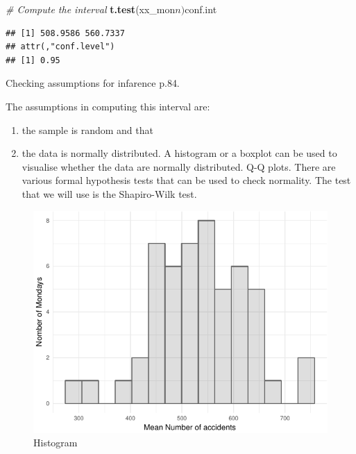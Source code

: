 \documentclass[]{article}
\newenvironment{Shaded}{\begin{snugshade}}{\end{snugshade}}
\newcommand{\KeywordTok}[1]{\textcolor[rgb]{0.13,0.29,0.53}{\textbf{{#1}}}}
\newcommand{\CommentTok}[1]{\textcolor[rgb]{0.56,0.35,0.01}{\textit{{#1}}}}
\newcommand{\NormalTok}[1]{{#1}}
\begin{document}
\begin{Shaded}
\begin{Highlighting}[]
\CommentTok{# Compute the interval}
\KeywordTok{t.test}\NormalTok{(xx_mon$n)$conf.int}
\end{Highlighting}
\end{Shaded}

\begin{verbatim}
## [1] 508.9586 560.7337
## attr(,"conf.level")
## [1] 0.95
\end{verbatim}

Checking assumptions for infarence p.84.

The assumptions in computing this interval are:

\begin{enumerate}
\def\labelenumi{(\arabic{enumi})}
\item
  the sample is random and that
\item
  the data is normally distributed. A histogram or a boxplot can be used
  to visualise whether the data are normally distributed. Q-Q plots.
  There are various formal hypothesis tests that can be used to check
  normality. The test that we will use is the Shapiro-Wilk test.
\end{enumerate}

\begin{figure}[H]

{\centering \includegraphics{READMEv4_files/figure-latex/fig4-1} 

}

\caption{Histogram}\label{fig:fig4}
\end{figure}
\end{document}
